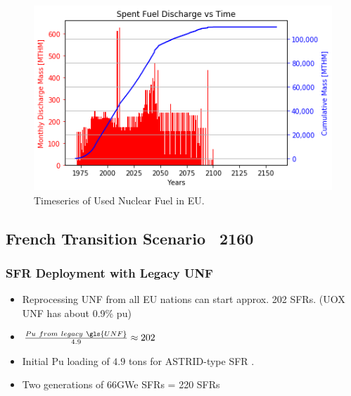 \begin{frame}

\begin{figure}[htbp!]
	\begin{center}
			\includegraphics[scale=0.7]{./images/eu_future/snf_discharge.png}
	\end{center}
	\caption{Timeseries of Used Nuclear Fuel in \gls{EU}.}
	\label{fig:eu_snf}
\end{figure}

\end{frame}

\subsection{French Transition Scenario ~2160}

\begin{frame}
	\frametitle{SFR Deployment with Legacy UNF}
	\begin{itemize}
		\item Reprocessing UNF from all EU nations can start approx. 202 SFRs. (\gls{UOX} \gls{UNF} has about 0.9\% pu)
		\item $\frac{Pu \ from \ legacy \ \gls{UNF}}{4.9} \approx 202$
		\item Initial Pu loading of $4.9$ tons for ASTRID-type SFR \cite{varaine_pre-conceptual_2012}.
		\item Two generations of 66GWe SFRs = 220 SFRs
	\end{itemize}
\end{frame}

